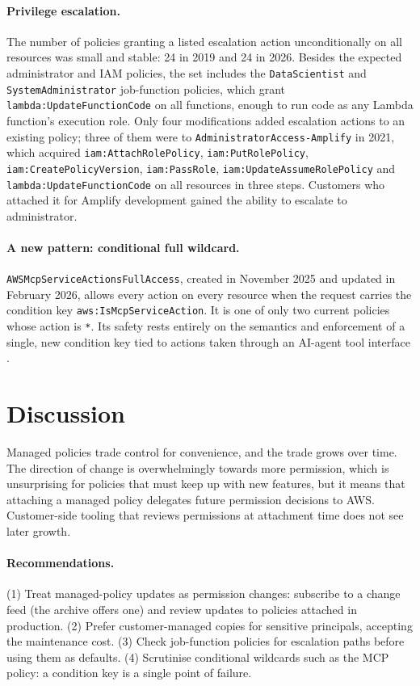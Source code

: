 \documentclass[11pt]{article}
\begin{document}
\paragraph{Privilege escalation.} The number of policies granting a listed escalation action unconditionally on all resources was small
and stable: 24 in 2019 and 24 in 2026. Besides the expected administrator and IAM policies, the set includes the \texttt{DataScientist}
and \texttt{SystemAdministrator} job-function policies, which grant \texttt{lambda:UpdateFunctionCode} on all functions, enough to run
code as any Lambda function's execution role. Only four modifications added escalation actions to an existing policy; three of them were
to \texttt{AdministratorAccess-Amplify} in 2021, which acquired \texttt{iam:AttachRolePolicy}, \texttt{iam:PutRolePolicy},
\texttt{iam:CreatePolicyVersion}, \texttt{iam:PassRole}, \texttt{iam:UpdateAssumeRolePolicy} and \texttt{lambda:UpdateFunctionCode} on
all resources in three steps. Customers who attached it for Amplify development gained the ability to escalate to administrator.

\paragraph{A new pattern: conditional full wildcard.} \texttt{AWSMcpServiceActionsFullAccess}, created in November 2025 and updated in
February 2026, allows every action on every resource when the request carries the condition key \texttt{aws:IsMcpServiceAction}. It is
one of only two current policies whose action is \texttt{*}. Its safety rests entirely on the semantics and enforcement of a single,
new condition key tied to actions taken through an AI-agent tool interface \cite{mcp2024}.

\section{Discussion}
Managed policies trade control for convenience, and the trade grows over time. The direction of change is overwhelmingly towards more
permission, which is unsurprising for policies that must keep up with new features, but it means that attaching a managed policy
delegates future permission decisions to AWS. Customer-side tooling that reviews permissions at attachment time does not see later
growth.

\paragraph{Recommendations.} (1) Treat managed-policy updates as permission changes: subscribe to a change feed (the archive offers
one) and review updates to policies attached in production. (2) Prefer customer-managed copies for sensitive principals, accepting the
maintenance cost. (3) Check job-function policies for escalation paths before using them as defaults. (4) Scrutinise conditional
wildcards such as the MCP policy: a condition key is a single point of failure.
\end{document}
